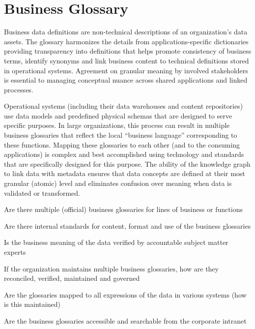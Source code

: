 \section{Business Glossary}\label{sec:ekgmm-b-2-4} %

Business data definitions are non-technical descriptions of an organization’s data assets.
The glossary harmonizes the details from applications-specific dictionaries providing transparency into definitions
that helps promote consistency of business terms, identify synonyms and link business content to technical
definitions stored in operational systems.
Agreement on granular meaning by involved stakeholders is essential to managing conceptual nuance across
shared applications and linked processes.

\kgmmekgrationalesection

Operational systems (including their data warehouses and content repositories) use data models and predefined
physical schemas that are designed to serve specific purposes.
In large organizations, this process can result in multiple business glossaries that reflect the
local “business language” corresponding to these functions.
Mapping these glossaries to each other (and to the consuming applications) is complex and best accomplished
using technology and standards that are specifically designed for this purpose.
The ability of the knowledge graph to link data with metadata ensures that data concepts are defined at their
most granular (atomic) level and eliminates confusion over meaning when data is validated or transformed.

\kgmmcorequestionssection

\begin{core-questions}

  \item [\thesection.1] Are there multiple (official) business glossaries for lines of business or functions
  \item [\thesection.2] Are there internal standards for content, format and use of the business glossaries
  \item [\thesection.3] Is the business meaning of the data verified by accountable subject matter experts
  \item [\thesection.4] If the organization maintains multiple business glossaries, how are they reconciled,
                        verified, maintained and governed
  \item [\thesection.5] Are the glossaries mapped to all expressions of the data in various systems
                        (how is this maintained)
  \item [\thesection.4] Are the business glossaries accessible and searchable from the corporate intranet

\end{core-questions}

